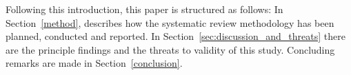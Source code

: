 Following this introduction, this paper is structured as follows: In Section~\ref{method}, describes how the systematic review methodology has been planned, conducted and reported. In Section~\ref{sec:discussion_and_threats} there are the principle findings and the threats to validity of this study. Concluding remarks are made in Section~\ref{conclusion}.